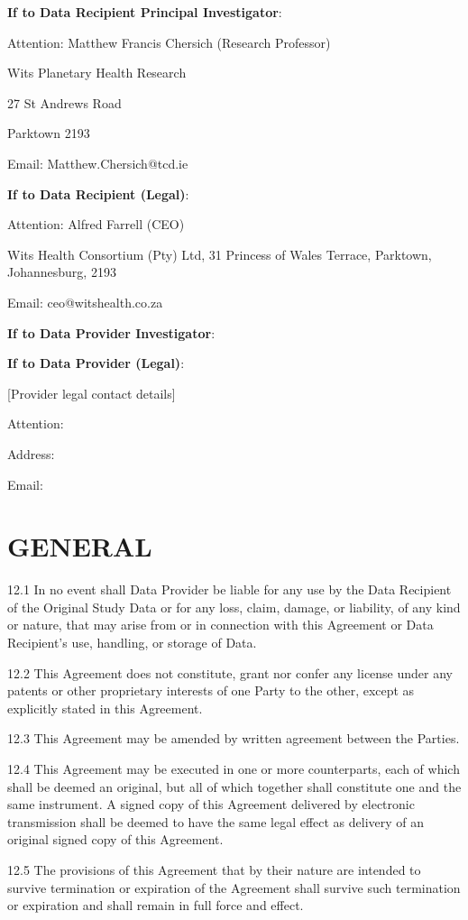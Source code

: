 {\begin{enumerate}
\textbf{If to Data Recipient Principal Investigator}:

Attention: Matthew Francis Chersich (Research Professor)

Wits Planetary Health Research

27 St Andrews Road

Parktown 2193

Email: Matthew.Chersich@tcd.ie

\textbf{If to Data Recipient (Legal)}:

Attention: Alfred Farrell (CEO)

Wits Health Consortium (Pty) Ltd, 31 Princess of Wales Terrace, Parktown, Johannesburg, 2193

Email: ceo@witshealth.co.za

\textbf{If to Data Provider Investigator}:

\textbf{If to Data Provider (Legal)}:

[Provider legal contact details]

Attention:

Address:

Email:

\section{GENERAL}

12.1 In no event shall Data Provider be liable for any use by the Data Recipient of the Original Study Data or for any loss, claim, damage, or liability, of any kind or nature, that may arise from or in connection with this Agreement or Data Recipient's use, handling, or storage of Data.

12.2 This Agreement does not constitute, grant nor confer any license under any patents or other proprietary interests of one Party to the other, except as explicitly stated in this Agreement.

12.3 This Agreement may be amended by written agreement between the Parties.

12.4 This Agreement may be executed in one or more counterparts, each of which shall be deemed an original, but all of which together shall constitute one and the same instrument. A signed copy of this Agreement delivered by electronic transmission shall be deemed to have the same legal effect as delivery of an original signed copy of this Agreement.

12.5 The provisions of this Agreement that by their nature are intended to survive termination or expiration of the Agreement shall survive such termination or expiration and shall remain in full force and effect.


\end{enumerate}}
